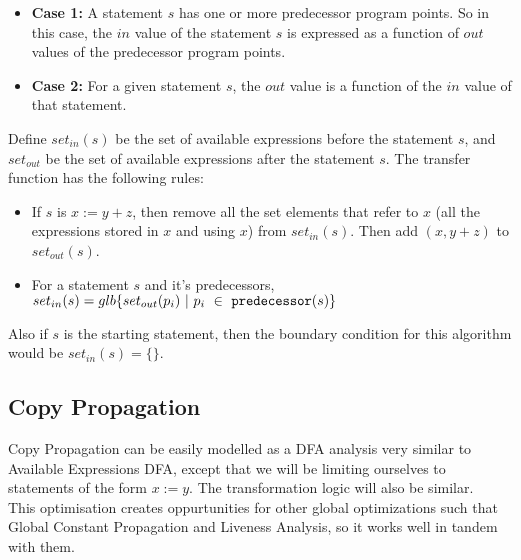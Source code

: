\begin{itemize}
    \item \textbf{Case 1:} A statement $s$ has one or more predecessor program points. So in this case, the $in$ value of the statement $s$ is expressed as a function of $out$ values of the predecessor program points.
    \item \textbf{Case 2:} For a given statement $s$, the $out$ value is a function of the $in$ value of that statement.
\end{itemize}

Define $set_{in}(s)$ be the set of available expressions before the statement $s$, and $set_{out}$ be the set of available expressions after the statement $s$. The transfer function has the following rules:

\begin{itemize}
    \item If $s$ is $x := y + z$, then remove all the set elements that refer to $x$ (all the expressions stored in $x$ and using $x$) from $set_{in}(s)$. Then add $(x,y+z)$ to $set_{out}(s)$.
    \item For a statement $s$ and it's predecessors, $set_{in}(s) = glb\{set_{out}(p_i)~|~p_i~\in~{\tt predecessor}(s)\}$
\end{itemize}

Also if $s$ is the starting statement, then the boundary condition for this algorithm would be $set_{in}(s) = \{\}$.

\subsection{Copy Propagation}
Copy Propagation can be easily modelled as a DFA analysis very similar to Available Expressions DFA, except that we will be limiting ourselves to statements of the form $x := y$. The transformation logic will also be similar.\\

This optimisation creates oppurtunities for other global optimizations such that Global Constant Propagation and Liveness Analysis, so it works well in tandem with them.

